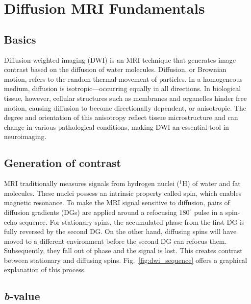 \clearpage

\section{Diffusion MRI Fundamentals}
\label{sec:background_dwifundamentals}

\subsection{Basics}
\label{subsec:background_dwibasics}

Diffusion-weighted imaging (DWI) is an MRI technique that generates image contrast based on the diffusion of water molecules. Diffusion, or Brownian motion, refers to the random thermal movement of particles. In a homogeneous medium, diffusion is isotropic—occurring equally in all directions. In biological tissue, however, cellular structures such as membranes and organelles hinder free motion, causing diffusion to become directionally dependent, or anisotropic. The degree and orientation of this anisotropy reflect tissue microstructure and can change in various pathological conditions, making DWI an essential tool in neuroimaging.

\subsection{Generation of contrast}
\label{subsec:background_dwicontrast}

MRI traditionally measures signals from hydrogen nuclei ($^1$H) of water and fat molecules. These nuclei possess an intrinsic property called spin, which enables magnetic resonance. To make the MRI signal sensitive to diffusion, pairs of diffusion gradients (DGs) are applied around a refocusing $180^{\circ}$ pulse in a spin-echo sequence. For stationary spins, the accumulated phase from the first DG is fully reversed by the second DG. On the other hand, diffusing spins will have moved to a different environment before the second DG can refocus them. Subsequently, they fall out of phase and the signal is lost. This creates contrast between stationary and diffusing spins. Fig.~\ref{fig:dwi_sequence} offers a graphical explanation of this process.

\subsection{\textit{b}-value}
\label{subsec:background_bvalue}

